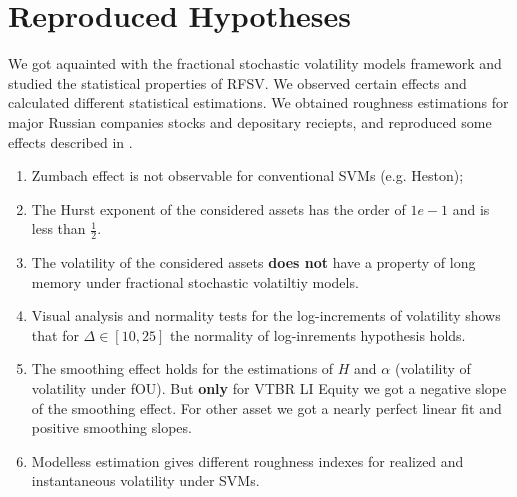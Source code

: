 \section*{Reproduced Hypotheses}
    We got aquainted with the fractional stochastic volatility models framework and
    studied the statistical properties of RFSV. We observed certain effects and calculated different statistical estimations.
    We obtained roughness estimations for major Russian companies stocks and depositary 
    reciepts, and reproduced some effects described in \cite{GatheralRosenbaum2014}.

    \begin{enumerate}
        \item Zumbach effect is not observable for conventional SVMs (e.g. Heston);
        \item The Hurst exponent of the considered assets has the order of $1e-1$ and is less than $\frac{1}{2}$.
        \item The volatility of the considered assets \textbf{does not} have a property of long memory under fractional stochastic 
                volatiltiy models.
        \item Visual analysis and normality tests for the log-increments of volatility shows that for 
              $\Delta \in [10, 25]$ the normality of log-inrements hypothesis holds.
        \item The smoothing effect holds for the estimations of $H$ and $\alpha$ (volatility of volatility under fOU). 
              But \textbf{only} for  VTBR LI Equity we got a negative slope of the smoothing effect. For other
              asset we got a nearly perfect linear fit and positive smoothing slopes.
        \item Modelless estimation gives different roughness indexes for realized and instantaneous volatility under SVMs.
    \end{enumerate}